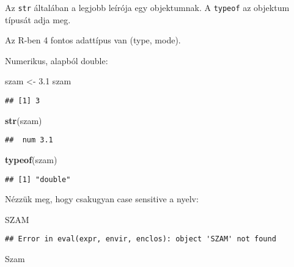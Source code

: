 \documentclass[]{book}
\newenvironment{Shaded}{\begin{snugshade}}{\end{snugshade}}
\newcommand{\FloatTok}[1]{\textcolor[rgb]{0.00,0.00,0.81}{#1}}
\newcommand{\KeywordTok}[1]{\textcolor[rgb]{0.13,0.29,0.53}{\textbf{#1}}}
\newcommand{\NormalTok}[1]{#1}
\newcommand{\StringTok}[1]{\textcolor[rgb]{0.31,0.60,0.02}{#1}}
\begin{document}
Az \texttt{str} általában a legjobb leírója egy objektumnak. A \texttt{typeof} az objektum típusát adja meg.

Az R-ben 4 fontos adattípus van (type, mode).

Numerikus, alapból double:

\begin{Shaded}
\begin{Highlighting}[]
\NormalTok{szam <-}\StringTok{ }\FloatTok{3.1}
\NormalTok{szam}
\end{Highlighting}
\end{Shaded}

\begin{verbatim}
## [1] 3
\end{verbatim}

\begin{Shaded}
\begin{Highlighting}[]
\KeywordTok{str}\NormalTok{(szam)}
\end{Highlighting}
\end{Shaded}

\begin{verbatim}
##  num 3.1
\end{verbatim}

\begin{Shaded}
\begin{Highlighting}[]
\KeywordTok{typeof}\NormalTok{(szam)}
\end{Highlighting}
\end{Shaded}

\begin{verbatim}
## [1] "double"
\end{verbatim}

Nézzük meg, hogy csakugyan case sensitive a nyelv:

\begin{Shaded}
\begin{Highlighting}[]
\NormalTok{SZAM}
\end{Highlighting}
\end{Shaded}

\begin{verbatim}
## Error in eval(expr, envir, enclos): object 'SZAM' not found
\end{verbatim}

\begin{Shaded}
\begin{Highlighting}[]
\NormalTok{Szam}
\end{Highlighting}
\end{Shaded}
\end{document}
